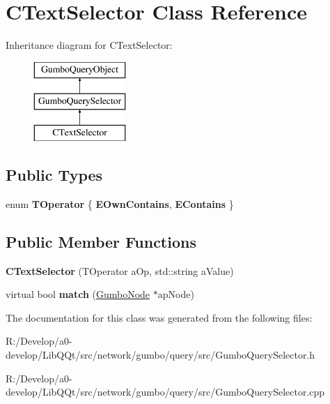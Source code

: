 \hypertarget{class_c_text_selector}{}\section{C\+Text\+Selector Class Reference}
\label{class_c_text_selector}
Inheritance diagram for C\+Text\+Selector\+:\begin{figure}[H]
\begin{center}
\leavevmode
\includegraphics[height=3.000000cm]{class_c_text_selector}
\end{center}
\end{figure}
\subsection*{Public Types}
\begin{DoxyCompactItemize}
\item 
\mbox{\label{class_c_text_selector_ad2f307a7d792e7d83825152ed9510bf3}} 
enum {\bfseries T\+Operator} \{ {\bfseries E\+Own\+Contains}, 
{\bfseries E\+Contains}
 \}
\end{DoxyCompactItemize}
\subsection*{Public Member Functions}
\begin{DoxyCompactItemize}
\item 
\mbox{\label{class_c_text_selector_a66aa78e57a26a9a75b490e455cd789c5}} 
{\bfseries C\+Text\+Selector} (T\+Operator a\+Op, std\+::string a\+Value)
\item 
\mbox{\label{class_c_text_selector_ab8b7a52b482fed99d244048ed04118ea}} 
virtual bool {\bfseries match} (\mbox{\hyperlink{gumbo_8h_a5f67d8397fda8fb7c90cc27f14ac4e7d}{Gumbo\+Node}} $\ast$ap\+Node)
\end{DoxyCompactItemize}


The documentation for this class was generated from the following files\+:\begin{DoxyCompactItemize}
\item 
R\+:/\+Develop/a0-\/develop/\+Lib\+Q\+Qt/src/network/gumbo/query/src/Gumbo\+Query\+Selector.\+h\item 
R\+:/\+Develop/a0-\/develop/\+Lib\+Q\+Qt/src/network/gumbo/query/src/Gumbo\+Query\+Selector.\+cpp\end{DoxyCompactItemize}
